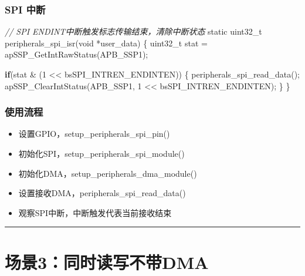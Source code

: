 \documentclass[
  12pt,
]{book}
\newenvironment{Shaded}{\begin{snugshade}}{\end{snugshade}}
\newcommand{\CommentTok}[1]{\textcolor[rgb]{0.56,0.35,0.01}{\textit{#1}}}
\newcommand{\ControlFlowTok}[1]{\textcolor[rgb]{0.13,0.29,0.53}{\textbf{#1}}}
\newcommand{\DataTypeTok}[1]{\textcolor[rgb]{0.13,0.29,0.53}{#1}}
\newcommand{\DecValTok}[1]{\textcolor[rgb]{0.00,0.00,0.81}{#1}}
\newcommand{\NormalTok}[1]{#1}
\providecommand{\tightlist}{%
  \setlength{\itemsep}{0pt}\setlength{\parskip}{0pt}}
\begin{document}
\hypertarget{spi-ux4e2dux65ad-2}{%
\subsubsection{SPI 中断}\label{spi-ux4e2dux65ad-2}}

\begin{Shaded}
\begin{Highlighting}[]
\CommentTok{// SPI ENDINT中断触发标志传输结束，清除中断状态}
\DataTypeTok{static} \DataTypeTok{uint32_t}\NormalTok{ peripherals_spi_isr(}\DataTypeTok{void}\NormalTok{ *user_data)}
\NormalTok{\{}
  \DataTypeTok{uint32_t}\NormalTok{ stat = apSSP_GetIntRawStatus(APB_SSP1);}
  
  \ControlFlowTok{if}\NormalTok{(stat & (}\DecValTok{1}\NormalTok{ << bsSPI_INTREN_ENDINTEN))}
\NormalTok{  \{}
\NormalTok{    peripherals_spi_read_data();}
\NormalTok{    apSSP_ClearIntStatus(APB_SSP1, }\DecValTok{1}\NormalTok{ << bsSPI_INTREN_ENDINTEN);}
\NormalTok{  \}  }
\NormalTok{\}}
\end{Highlighting}
\end{Shaded}

\hypertarget{ux4f7fux7528ux6d41ux7a0b-11}{%
\subsubsection{使用流程}\label{ux4f7fux7528ux6d41ux7a0b-11}}

\begin{itemize}
\tightlist
\item
  设置GPIO，setup\_peripherals\_spi\_pin()
\item
  初始化SPI，setup\_peripherals\_spi\_module()
\item
  初始化DMA，setup\_peripherals\_dma\_module()
\item
  设置接收DMA，peripherals\_spi\_read\_data()
\item
  观察SPI中断，中断触发代表当前接收结束
\end{itemize}

\begin{center}\rule{0.5\linewidth}{0.5pt}\end{center}

\hypertarget{ux573aux666f3ux540cux65f6ux8bfbux5199ux4e0dux5e26dma}{%
\section{场景3：同时读写不带DMA}\label{ux573aux666f3ux540cux65f6ux8bfbux5199ux4e0dux5e26dma}}
\end{document}
